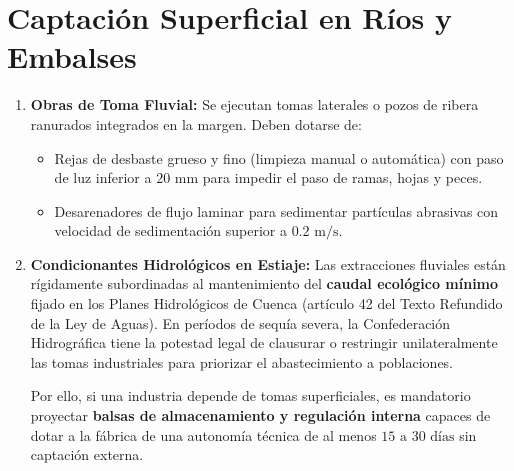 \documentclass{report}
\begin{document}
\section{Captación Superficial en Ríos y Embalses}
\begin{enumerate}
    \item \textbf{Obras de Toma Fluvial:} Se ejecutan tomas laterales o pozos de ribera ranurados integrados en la margen. Deben dotarse de:
    \begin{itemize}
        \item Rejas de desbaste grueso y fino (limpieza manual o automática) con paso de luz inferior a $20\text{ mm}$ para impedir el paso de ramas, hojas y peces.
        \item Desarenadores de flujo laminar para sedimentar partículas abrasivas con velocidad de sedimentación superior a $0.2\text{ m/s}$.
    \end{itemize}
    \item \textbf{Condicionantes Hidrológicos en Estiaje:} Las extracciones fluviales están rígidamente subordinadas al mantenimiento del \textbf{caudal ecológico mínimo} fijado en los Planes Hidrológicos de Cuenca (artículo 42 del Texto Refundido de la Ley de Aguas). En períodos de sequía severa, la Confederación Hidrográfica tiene la potestad legal de clausurar o restringir unilateralmente las tomas industriales para priorizar el abastecimiento a poblaciones.

    Por ello, si una industria depende de tomas superficiales, es mandatorio proyectar \textbf{balsas de almacenamiento y regulación interna} capaces de dotar a la fábrica de una autonomía técnica de al menos $15\text{ a }30\text{ días}$ sin captación externa.
\end{enumerate}
\end{document}
